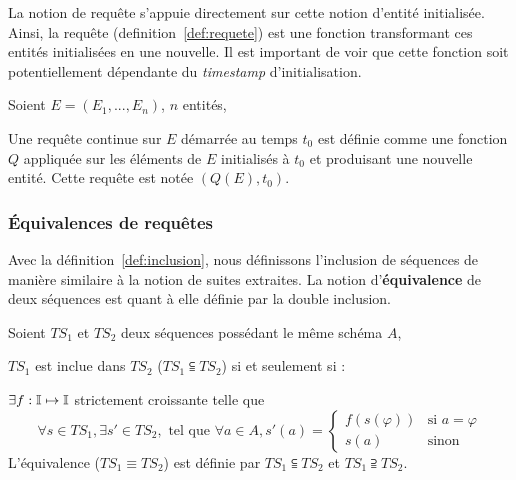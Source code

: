 La notion de requête s'appuie directement sur cette notion d'entité initialisée. Ainsi, la requête (definition~\ref{def:requete}) est une fonction transformant ces entités initialisées en une nouvelle. Il est important de voir que cette fonction soit potentiellement dépendante du \textit{timestamp} d'initialisation.
\begin{defi}[Requête]\label{def:requete}
	Soient $E=(E_1, ..., E_n)$, $n$ entités,
	
	Une requête continue sur $E$ démarrée au temps $t_0$ est définie comme une fonction $Q$ appliquée sur les éléments de $E$ initialisés à $t_0$ et produisant une nouvelle entité. Cette requête est notée $(Q(E),t_0)$.
\end{defi}

\subsubsection{Équivalences de requêtes}
Avec la définition~\ref{def:inclusion}, nous définissons l'inclusion de séquences de manière similaire à la notion de suites extraites. La notion d'\textbf{équivalence} de deux séquences est quant à elle définie par la double inclusion. 
\begin{defi}\label{def:inclusion}
	Soient $TS_1$ et $TS_2$ deux séquences possédant le même schéma $A$,
	
	$TS_1$ est inclue dans $TS_2$ ($TS_1 \subseteqq TS_2$) si et seulement si : 
	
	\quad \quad $\exists f:\mathbb{I} \mapsto \mathbb{I}$ strictement croissante telle que 
$$\forall s\in TS_1, \exists s'\in TS_2, \textrm{ tel que } \forall a \in A, s'(a) = \begin{cases} f(s(\varphi)) & \textrm{si } a = \varphi \\ s(a) & \textrm{sinon}\end{cases}$$
	L'équivalence ($TS_1 \equiv TS_2$) est définie par $TS_1 \subseteqq TS_2$ et $TS_1 \supseteqq TS_2$. 
\end{defi}%


